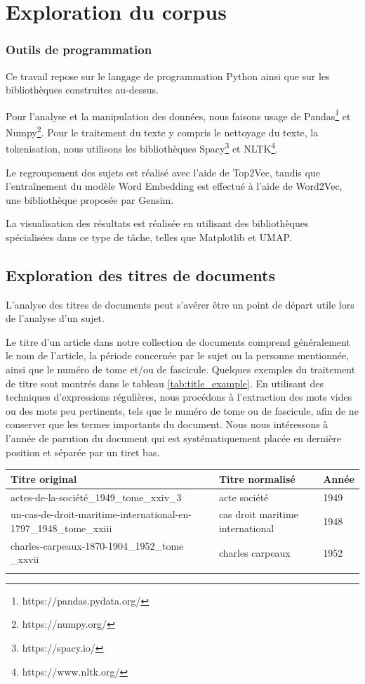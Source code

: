 
\section{Exploration du corpus}
\subsubsection{Outils de programmation}

Ce travail repose sur le langage de programmation Python ainsi que sur les bibliothèques construites au-dessus.

Pour l'analyse et la manipulation des données, nous faisons usage de Pandas\footnote{https://pandas.pydata.org/} et Numpy\footnote{https://numpy.org/}. Pour le traitement du texte y compris le nettoyage du texte, la tokenisation, nous utilisons les bibliothèques Spacy\footnote{https://spacy.io/} et NLTK\footnote{https://www.nltk.org/}.

Le regroupement des sujets est réalisé avec l'aide de Top2Vec, tandis que l'entraînement du modèle Word Embedding est effectué à l'aide de Word2Vec, une bibliothèque proposée par Gensim.

La visualisation des résultats est réalisée en utilisant des bibliothèques spécialisées dans ce type de tâche, telles que Matplotlib et UMAP.

\subsection{Exploration des titres de documents}

L'analyse des titres de documents peut s'avérer être un point de départ utile lors de l'analyse d'un sujet.

Le titre d'un article dans notre collection de documents comprend généralement le nom de l'article, la période concernée par le sujet ou la personne mentionnée, ainsi que le numéro de tome et/ou de fascicule. Quelques exemples du traitement de titre sont montrés dans le tableau \ref{tab:title_example}. En utilisant des techniques d'expressions régulières, nous procédons à l'extraction des mots vides ou des mots peu pertinents, tels que le numéro de tome ou de fascicule, afin de ne conserver que les termes importants du document. Nous nous intéressons à l'année de parution du document qui est systématiquement placée en dernière position et séparée par un tiret bas.

\begin{tabularx}{\textwidth}{X|l|l}
  \textbf{Titre original} & \textbf{Titre normalisé} & \textbf{Année} \\
\hline
 {actes-de-la-société\_1949\_tome\_xxiv\_3} &  acte société & 1949\\ 
\hline
    {un-cas-de-droit-maritime-international-en-1797\_1948\_tome\_xxiii} &  cas droit maritime international & 1948 \\
\hline
    {charles-carpeaux-1870-1904\_1952\_tome \_xxvii} & charles carpeaux& 1952 \\ 
    \label{tab:title_example}
\end{tabularx}

